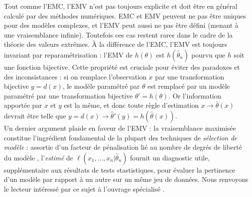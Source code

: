 Tout comme l'EMC, l'EMV n'est pas toujours explicite  et doit \^etre en g\'en\'eral calcul\'e par des m\'ethodes num\'eriques. EMC et EMV peuvent ne pas \^etre uniques pour des mod\`eles complexes, et l'EMV peut aussi ne pas \^etre d\'efini (menant \`a une vraisemblance infinie). Toutefois ces cas restent rares dans le cadre de la th\'eorie des valeurs extr\^emes.  \`A la diff\'erence de l'EMC, l'EMV est toujours invariant par reparam\'etrisation : l'EMV de $h(\theta)$ est $h(\hat{\theta}_n)$ pourvu que $h$ soit une fonction bijective. Cette propri\'et\'e est cruciale pour \'eviter des paradoxes et des inconsistances : si on remplace l'observation $x$ par une transformation bijective $y=d(x)$, le mod\`ele param\'etr\'e par $\theta$ est remplac\'e par un mod\`ele param\'etr\'e par une transformation bijective $\theta'=h(\theta)$. Or l'information apport\'ee par $x$ et $y$ est la m\^eme, et donc toute r\`egle d'estimation $x\to \hat{\theta}(x)$ devrait \^etre telle que $y=d(x)\to \hat{\theta}'(y)=h(\hat{\theta}(x))$. \\

Un dernier argument plaide en faveur de l'EMV : la vraisemblance maximis\'ee constitue l'ingr\'edient fondamental de la plupart des techniques de {\it s\'election de mod\`ele}  : assortie d'un facteur de p\'enalisation li\'e au nombre de degr\'es de libert\'e du mod\`ele  \cite{BIC,AIC}, l'{\it estim\'e} de $\ell(x_1,\ldots,x_n|\hat{\theta}_n)$ fournit un diagnostic utile, suppl\'ementaire aux r\'esultats de tests stastistiques, pour \'evaluer la pertinence d'un mod\`ele par rapport \`a un autre sur un m\^eme jeu de donn\'ees. Nous renvoyons le lecteur int\'eress\'e par ce sujet \`a l'ouvrage sp\'ecialis\'e \cite{Planzagl1994}. \\




